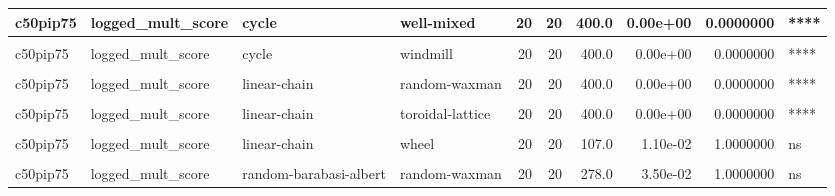 \documentclass[
]{book}
\begin{document}
\begin{table}
\begin{tabular}{l|l|l|l|r|r|r|r|r|l}
\hline
c50pip75 & logged\_mult\_score & cycle & well-mixed & 20 & 20 & 400.0 & 0.00e+00 & 0.0000000 & ****\\
\hline
\cellcolor{gray!6}{c50pip75} & \cellcolor{gray!6}{logged\_mult\_score} & \cellcolor{gray!6}{cycle} & \cellcolor{gray!6}{wheel} & \cellcolor{gray!6}{20} & \cellcolor{gray!6}{20} & \cellcolor{gray!6}{104.0} & \cellcolor{gray!6}{9.00e-03} & \cellcolor{gray!6}{1.0000000} & \cellcolor{gray!6}{ns}\\
\hline
c50pip75 & logged\_mult\_score & cycle & windmill & 20 & 20 & 400.0 & 0.00e+00 & 0.0000000 & ****\\
\hline
\cellcolor{gray!6}{c50pip75} & \cellcolor{gray!6}{logged\_mult\_score} & \cellcolor{gray!6}{linear-chain} & \cellcolor{gray!6}{random-barabasi-albert} & \cellcolor{gray!6}{20} & \cellcolor{gray!6}{20} & \cellcolor{gray!6}{399.0} & \cellcolor{gray!6}{0.00e+00} & \cellcolor{gray!6}{0.0000000} & \cellcolor{gray!6}{****}\\
\hline
c50pip75 & logged\_mult\_score & linear-chain & random-waxman & 20 & 20 & 400.0 & 0.00e+00 & 0.0000000 & ****\\
\hline
\cellcolor{gray!6}{c50pip75} & \cellcolor{gray!6}{logged\_mult\_score} & \cellcolor{gray!6}{linear-chain} & \cellcolor{gray!6}{star} & \cellcolor{gray!6}{20} & \cellcolor{gray!6}{20} & \cellcolor{gray!6}{51.0} & \cellcolor{gray!6}{1.83e-05} & \cellcolor{gray!6}{0.0031293} & \cellcolor{gray!6}{**}\\
\hline
c50pip75 & logged\_mult\_score & linear-chain & toroidal-lattice & 20 & 20 & 400.0 & 0.00e+00 & 0.0000000 & ****\\
\hline
\cellcolor{gray!6}{c50pip75} & \cellcolor{gray!6}{logged\_mult\_score} & \cellcolor{gray!6}{linear-chain} & \cellcolor{gray!6}{well-mixed} & \cellcolor{gray!6}{20} & \cellcolor{gray!6}{20} & \cellcolor{gray!6}{400.0} & \cellcolor{gray!6}{0.00e+00} & \cellcolor{gray!6}{0.0000000} & \cellcolor{gray!6}{****}\\
\hline
c50pip75 & logged\_mult\_score & linear-chain & wheel & 20 & 20 & 107.0 & 1.10e-02 & 1.0000000 & ns\\
\hline
\cellcolor{gray!6}{c50pip75} & \cellcolor{gray!6}{logged\_mult\_score} & \cellcolor{gray!6}{linear-chain} & \cellcolor{gray!6}{windmill} & \cellcolor{gray!6}{20} & \cellcolor{gray!6}{20} & \cellcolor{gray!6}{400.0} & \cellcolor{gray!6}{0.00e+00} & \cellcolor{gray!6}{0.0000000} & \cellcolor{gray!6}{****}\\
\hline
c50pip75 & logged\_mult\_score & random-barabasi-albert & random-waxman & 20 & 20 & 278.0 & 3.50e-02 & 1.0000000 & ns\\

\end{tabular}
\end{table}
\end{document}
